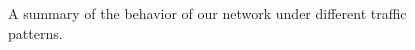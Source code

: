 \documentclass[10pt]{article}
\begin{document}
\begin{figure}[h]
\caption{A summary of the behavior of our network under different traffic
		 patterns.}
\label{fig:patterns}
\end{figure}
\end{document}
